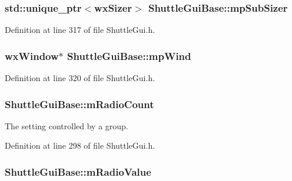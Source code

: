 \subsubsection[{\texorpdfstring{mp\+Sub\+Sizer}{mpSubSizer}}]{\setlength{\rightskip}{0pt plus 5cm}std\+::unique\+\_\+ptr$<$wx\+Sizer$>$ Shuttle\+Gui\+Base\+::mp\+Sub\+Sizer\hspace{0.3cm}{\ttfamily [protected]}}\hypertarget{class_shuttle_gui_base_aff77a46f8efe09d0faf7f03cf9a97686}{}\label{class_shuttle_gui_base_aff77a46f8efe09d0faf7f03cf9a97686}


Definition at line 317 of file Shuttle\+Gui.\+h.

\subsubsection[{\texorpdfstring{mp\+Wind}{mpWind}}]{\setlength{\rightskip}{0pt plus 5cm}wx\+Window$\ast$ Shuttle\+Gui\+Base\+::mp\+Wind\hspace{0.3cm}{\ttfamily [protected]}}\hypertarget{class_shuttle_gui_base_af9fd9b06ff97539ce5bbf527c8b9be4f}{}\label{class_shuttle_gui_base_af9fd9b06ff97539ce5bbf527c8b9be4f}


Definition at line 320 of file Shuttle\+Gui.\+h.

\subsubsection[{\texorpdfstring{m\+Radio\+Count}{mRadioCount}}]{ Shuttle\+Gui\+Base\+::m\+Radio\+Count\hspace{0.3cm}{\ttfamily [protected]}}\hypertarget{class_shuttle_gui_base_ada23c70f67c02e2c8d83ad4cfd20d666}{}\label{class_shuttle_gui_base_ada23c70f67c02e2c8d83ad4cfd20d666}


The setting controlled by a group. 



Definition at line 298 of file Shuttle\+Gui.\+h.

\subsubsection[{\texorpdfstring{m\+Radio\+Value}{mRadioValue}}]{ Shuttle\+Gui\+Base\+::m\+Radio\+Value\hspace{0.3cm}{\ttfamily [protected]}}\hypertarget{class_shuttle_gui_base_a442c9153302934143136af472620dfe5}{}\label{class_shuttle_gui_base_a442c9153302934143136af472620dfe5}


